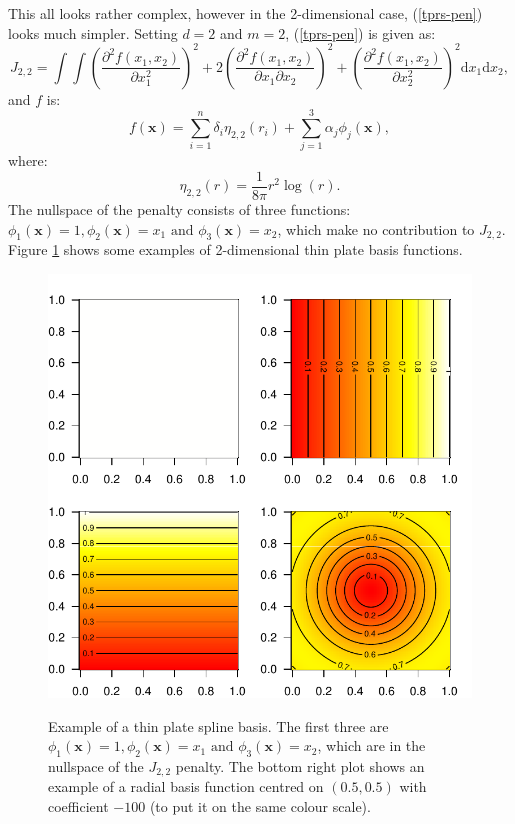 This all looks rather complex, however in the 2-dimensional case, (\ref{tprs-pen}) looks much simpler. Setting $d=2$ and $m=2$, (\ref{tprs-pen}) is given as:
\begin{equation*}
J_{2,2} = \int \int \left ( \frac{\partial^2 f(x_1,x_2)}{\partial x_1^2} \right )^2 + 2\left ( \frac{\partial^2 f(x_1,x_2)}{\partial x_1  \partial x_2} \right )^2 + \left ( \frac{\partial^2 f(x_1,x_2)}{\partial x_2^2} \right )^2 \text{d} x_1 \text{d} x_2,
\end{equation*}
and $f$ is:
\begin{equation*}
f(\mathbf{x}) = \sum_{i=1}^n \delta_i \eta_{2,2}(r_i) + \sum_{j=1}^3 \alpha_j \phi_j(\mathbf{x}),
\end{equation*}
where:
\begin{equation*}
\eta_{2,2}(r) = \frac{1}{8\pi} r^2 \log(r).
\end{equation*}
The nullspace of the penalty consists of three functions: $\phi_1(\mathbf{x})=1, \phi_2(\mathbf{x})=x_1 \text{ and } \phi_3(\mathbf{x})=x_2$, which make no contribution to $J_{2,2}$. Figure \ref{tprs-basis-fig} shows some examples of 2-dimensional thin plate basis functions.

\begin{figure}[p]
\centering
\includegraphics[width=\textwidth]{intro/figs/tprsex.pdf}\\
\caption{Example of a thin plate spline basis. The first three are $\phi_1(\mathbf{x})=1, \phi_2(\mathbf{x})=x_1 \text{ and } \phi_3(\mathbf{x})=x_2$, which are in the nullspace of the $J_{2,2}$ penalty. The bottom right plot shows an example of a radial basis function centred on $(0.5,0.5)$ with coefficient $-100$ (to put it on the same colour scale).}
\label{tprs-basis-fig}
\end{figure}


